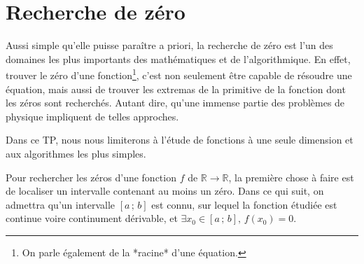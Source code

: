 \section{Recherche de zéro}
Aussi simple qu'elle puisse paraître a priori, la recherche
de zéro est
l'un des domaines les plus importants des mathématiques et de l'algorithmique.
En effet, trouver le zéro d'une fonction\footnote{On parle également de la *racine* d'une équation.},
c'est non seulement
être capable de résoudre une équation, mais aussi de trouver
les extremas de la primitive de la fonction dont les zéros sont recherchés.
Autant dire, qu'une immense partie des problèmes de physique impliquent
de telles approches.

Dans ce TP, nous nous limiterons à l'étude de fonctions à une seule dimension et
aux algorithmes les plus simples.

Pour rechercher les zéros d'une
fonction $f$ de $\mathbb{R}  \longrightarrow  \mathbb{R}$,
la première chose à faire est  de localiser un intervalle contenant
au moins un zéro. Dans ce qui suit, on admettra qu'un intervalle $[a\,;\,b]$
est connu, sur lequel la fonction étudiée est continue voire continument dérivable, et $\exists x_0 \in  [a\,;\,b], \, f(x_0)=0$.

